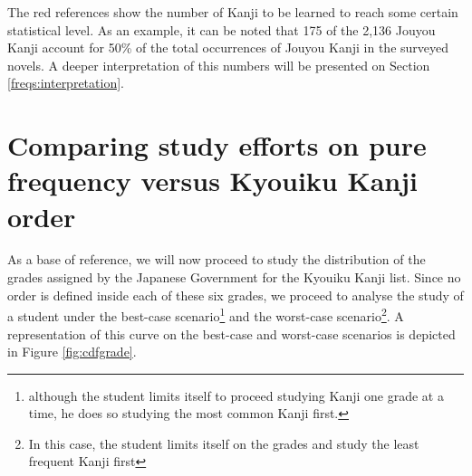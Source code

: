 The red references show the number of Kanji to be learned to reach some certain statistical level. As an example, it can be noted that 175 of the 2,136 Jouyou Kanji account for 50\% of the total occurrences of Jouyou Kanji in the surveyed novels. A deeper interpretation of this numbers will be presented on Section \ref{freqs:interpretation}.

\section{Comparing study efforts on pure frequency versus Kyouiku Kanji order}

As a base of reference, we will now proceed to study the distribution of the grades assigned by the Japanese Government for the Kyouiku Kanji list. Since no order is defined inside each of these six grades, we proceed to analyse the study of a student under the best-case scenario\footnote{although the student limits itself to proceed studying Kanji one grade at a time, he does so studying the most common Kanji first.} and the worst-case scenario\footnote{In this case, the student limits itself on the grades and study the least frequent Kanji first}. A representation of this curve on the best-case and worst-case scenarios is depicted in Figure \ref{fig:cdfgrade}.

